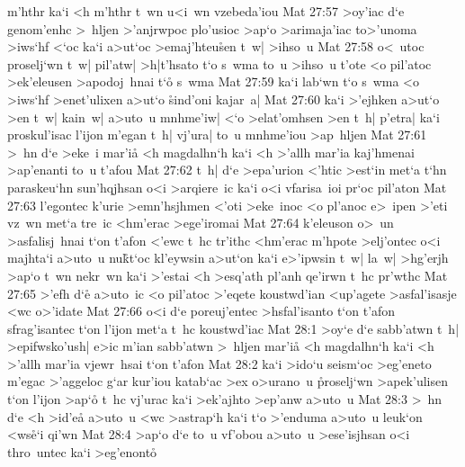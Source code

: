 m'hthr
ka`i
<h
m'hthr
t~wn
u<i~wn
vzebeda'iou\bibvsend
\vs Mat 27:57
>oy'iac
d`e
genom'enhc
>~hljen
>'anjrwpoc
plo'usioc
>ap`o
>arimaja'iac
to>'unoma
>iws`hf
<`oc
ka`i
a>ut`oc
>emaj'hteu\r{s}en
t~w|
>ihso~u\bibvsend
\vs Mat 27:58
o<~utoc
proselj`wn
t~w|
pil'atw|
>h|t'hsato
t`o
s~wma
to~u
>ihso~u
t'ote
<o
pil'atoc
>ek'eleusen
>apodoj~hnai
t`o\r{}
s~wma\bibvsend
\vs Mat 27:59
ka`i
lab`wn
t`o
s~wma
<o
>iws`hf
>enet'ulixen
a>ut`o
\r{s}ind'oni
kajar~a|\bibvsend
\vs Mat 27:60
ka`i
>'ejhken
a>ut`o
>en
t~w|
kain~w|
a>uto~u
mnhme'iw|
<`o
>elat'omhsen
>en
t~h|
p'etra|
ka`i
proskul'isac
l'ijon
m'egan
t~h|
vj'ura|
to~u
mnhme'iou
>ap~hljen\bibvsend
\vs Mat 27:61
>~hn
d`e
>eke~i
mar'i\r{a}
<h
magdalhn`h
ka`i
<h
>'allh
mar'ia
kaj'hmenai
>ap'enanti
to~u
t'afou\bibvsend
\vs Mat 27:62
t~h|
d`e
>epa'urion
<'htic
>est`in
met`a
t`hn
paraskeu`hn
sun'hqjhsan
o<i
>arqiere~ic
ka`i
o<i
vfarisa~ioi
pr`oc
pil'aton\bibvsend
\vs Mat 27:63
l'egontec
k'urie
>emn'hsjhmen
<'oti
>eke~inoc
<o
pl'anoc
e>~ipen
>'eti
vz~wn
met`a
tre~ic
<hm'erac
>ege'iromai\bibvsend
\vs Mat 27:64
k'eleuson
o>~un
>asfalisj~hnai
t`on
t'afon
<'ewc
t~hc
tr'ithc
<hm'erac
m'hpote
>elj'ontec
o<i
majhta`i
a>uto~u
nu\r{k}t`oc
kl'eywsin
a>ut`on
ka`i
e>'ipwsin
t~w|
la~w|
>hg'erjh
>ap`o
t~wn
nekr~wn
ka`i
>'estai
<h
>esq'ath
pl'anh
qe'irwn
t~hc
pr'wthc\bibvsend
\vs Mat 27:65
>'efh
d`e\r{}
a>uto~ic
<o
pil'atoc
>'eqete
koustwd'ian
<up'agete
>asfal'isasje
<wc
o>'idate\bibvsend
\vs Mat 27:66
o<i
d`e
poreuj'entec
>hsfal'isanto
t`on
t'afon
sfrag'isantec
t`on
l'ijon
met`a
t~hc
koustwd'iac\bibvsend
\vs Mat 28:1
>oy`e
d`e
sabb'atwn
t~h|
>epifwsko'ush|
e>ic
m'ian
sabb'atwn
>~hljen
mar'i\r{a}
<h
magdalhn`h
ka`i
<h
>'allh
mar'ia
vjewr~hsai
t`on
t'afon\bibvsend
\vs Mat 28:2
ka`i
>ido`u
seism`oc
>eg'eneto
m'egac
>'aggeloc
g`ar
kur'iou
katab`ac
>ex
o>urano~u
\r{p}roselj`wn
>apek'ulisen
t`on
l'ijon
>ap`o\r{}
t~hc
vj'urac
ka`i
>ek'ajhto
>ep'anw
a>uto~u\bibvsend
\vs Mat 28:3
>~hn
d`e
<h
>id'e\r{a}
a>uto~u
<wc
>astrap`h
ka`i
t`o
>'enduma
a>uto~u
leuk`on
<ws\r{e}`i
qi'wn\bibvsend
\vs Mat 28:4
>ap`o
d`e
to~u
vf'obou
a>uto~u
>ese'isjhsan
o<i
thro~untec
ka`i
>eg'enonto\r{}
